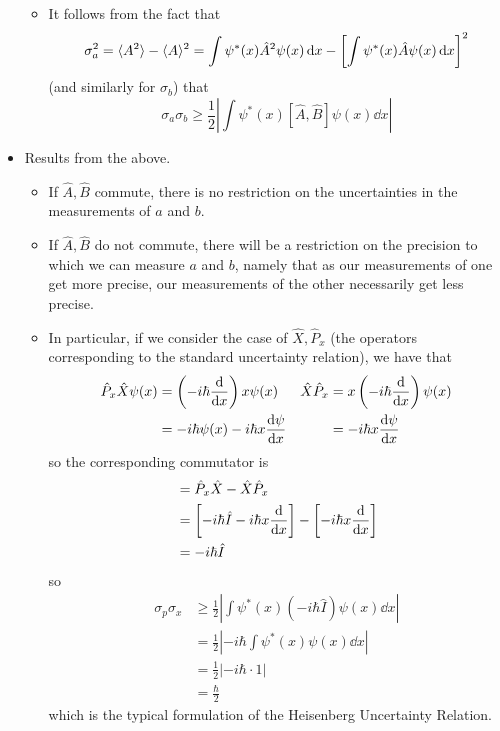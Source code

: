 \documentclass[../notes.tex]{subfiles}
\begin{document}
\begin{itemize}
\begin{itemize}
        \item It follows from the fact that
        \begin{equation*}
            \sigma_a^2 = \langle{A^2}\rangle-\langle{A}\rangle^2 = \int\psi^*(x)\hat{A}^2\psi(x)\dd{x}-\left[ \int\psi^*(x)\hat{A}\psi(x)\dd{x} \right]^2
        \end{equation*}
        (and similarly for $\sigma_b$) that
        \begin{equation*}
            \sigma_a\sigma_b \geq \frac{1}{2}\left| \int\psi^*(x)[\hat{A},\hat{B}]\psi(x)\dd{x} \right|
        \end{equation*}
    \end{itemize}
    \item Results from the above.
    \begin{itemize}
        \item If $\hat{A},\hat{B}$ commute, there is no restriction on the uncertainties in the measurements of $a$ and $b$.
        \item If $\hat{A},\hat{B}$ do not commute, there will be a restriction on the precision to which we can measure $a$ and $b$, namely that as our measurements of one get more precise, our measurements of the other necessarily get less precise.
        \item In particular, if we consider the case of $\hat{X},\hat{P}_x$ (the operators corresponding to the standard uncertainty relation), we have that
        \begin{align*}
            \hat{P}_x\hat{X}\psi(x) &= \left( -i\hbar\dv{x} \right)x\psi(x)&
                \hat{X}\hat{P}_x &= x\left( -i\hbar\dv{x} \right)\psi(x)\\
            &= -i\hbar\psi(x)-i\hbar x\dv{\psi}{x}&
                &= -i\hbar x\dv{\psi}{x}
        \end{align*}
        so the corresponding commutator is
        \begin{align*}
            [\hat{P}_x,\hat{X}] &= \hat{P}_x\hat{X}-\hat{X}\hat{P}_x\\
            &= \left[ -i\hbar\hat{I}-i\hbar x\dv{x} \right]-\left[ -i\hbar x\dv{x} \right]\\
            &= -i\hbar\hat{I}
        \end{align*}
        so
        \begin{align*}
            \sigma_p\sigma_x &\geq \frac{1}{2}\left| \int\psi^*(x)(-i\hbar\hat{I})\psi(x)\dd{x} \right|\\
            &= \frac{1}{2}\left| -i\hbar\int\psi^*(x)\psi(x)\dd{x} \right|\\
            &= \frac{1}{2}\left| -i\hbar\cdot 1 \right|\\
            &= \frac{\hbar}{2}
        \end{align*}
        which is the typical formulation of the Heisenberg Uncertainty Relation.
    \end{itemize}
\end{itemize}
\end{document}
